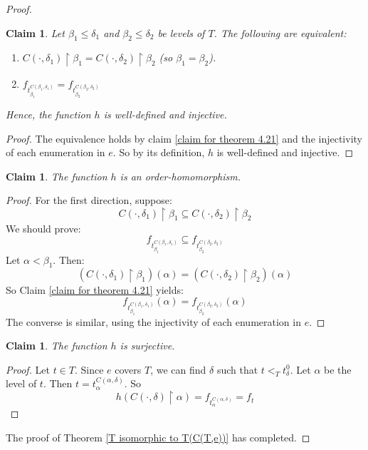 \documentclass[11pt]{amsart}
\theoremstyle{plain}
\newtheorem{claim}[theorem]{Claim}
\theoremstyle{definition} %
\theoremstyle{remark}
\newcommand{\be}{\begin{enumerate}}
\newcommand{\ee}{\end{enumerate}}
\begin{document}
\begin{proof}
\begin{claim}\label{claim result of claim for theorem 4.21}
Let $\beta_1 \leq \delta_1$ and $\beta_2 \leq \delta_2$ be levels of $T$. The following are equivalent:
\be
\item
$C(\cdot,\delta_1) \restriction \beta_1=C(\cdot,\delta_2) \restriction \beta_2$ (so $\beta_1=\beta_2$).
\item
$f_{t^{C(\beta_1,\delta_1)}_{\beta_1}}=f_{t^{C(\beta_2,\delta_2)}_{\beta_2}}$
\ee
Hence, the function $h$ is well-defined and injective.
\end{claim}

\begin{proof}
The equivalence holds by claim \ref{claim for theorem 4.21} and the injectivity of each enumeration in $e$.
So by its definition, $h$ is well-defined and injective.
\end{proof}

\begin{claim}
The function $h$ is an order-homomorphism.
\end{claim}

\begin{proof}


For the first direction, suppose:
 $$C(\cdot,\delta_1) \restriction \beta_1 \subseteq C(\cdot,\delta_2) \restriction \beta_2$$
We should prove:
\[
f_{t_{\beta_1}^{C(\beta_1,\delta_1)}} \subseteq f_{t_{\beta_2}^{C(\beta_2,\delta_2)}}
\]
Let $\alpha<\beta_1$. Then:
\[
(C(\cdot,\delta_1) \restriction \beta_1)(\alpha)= (C(\cdot,\delta_2) \restriction \beta_2)(\alpha)
\]
So Claim \ref{claim for theorem 4.21} yields:
\[
f_{t_{\beta_1}^{C(\beta_1,\delta_1)}}(\alpha)= f_{t_{\beta_2}^{C(\beta_2,\delta_2)}}(\alpha)
\]
The converse is similar, using the injectivity of each enumeration in $e$.
\end{proof}



\begin{claim}
The function $h$ is surjective.
\end{claim}

\begin{proof}
Let $t \in T$. Since $e$ covers $T$, we can find $\delta$ such that $t <_T t_\delta^0$. Let $\alpha$ be the level of $t$. Then $t=t_\alpha^{C(\alpha,\delta)}$. So
\[
h(C(\cdot,\delta) \restriction \alpha)=f_{t_\alpha^{C(\alpha,\delta)}}=f_t
\]
\end{proof}
The proof of Theorem \ref{T isomorphic to T(C(T,e))} has completed.
\end{proof}
\end{document}

